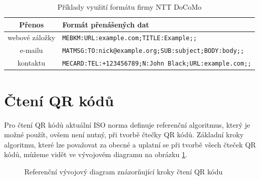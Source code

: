 \begin{table}[H]
  \begin{center} 
    \begin{tabular}{| c | l |} \hline
    \textbf{Přenos} & \textbf{Formát přenášených dat} \\ \hline
    webové záložky & \texttt{MEBKM:URL:example.com;TITLE:Example;;} \\ \hline
    e-mailu & \texttt{MATMSG:TO:nick@example.org;SUB:subject;BODY:body;;}\\
    \hline kontaktu & \texttt{MECARD:TEL:+123456789;N:John
    Black;URL:example.com;;} \\ \hline
    \end{tabular}
    \caption{Příklady využití formátu firmy NTT DoCoMo}
    \label{DOCOMOFormatsTable}
  \end{center}
\end{table}

\section{Čtení QR kódů}
\label{refCteniQRKodu}

Pro čtení QR kódů aktuální ISO norma definuje referenční algoritmus, který je
možné použít, ovšem není nutný, při tvorbě čtečky QR kódů. Základní kroky 
algoritmu, které lze považovat za obecné a uplatní se při tvorbě všech čteček 
QR kódů, můžeme vidět ve vývojovém diagramu na obrázku
\ref{QRCodeReferenceReadingProcess}.

\begin{figure}[H]
  \begin{center}
    \caption{Referenční vývojový diagram znázorňující kroky čtení QR kódu}
    \label{QRCodeReferenceReadingProcess}
  \end{center}
\end{figure}

